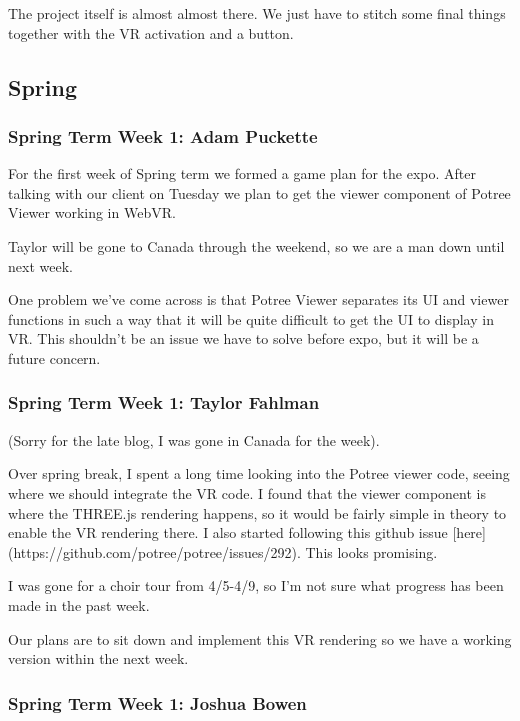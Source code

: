 \documentclass[draftclsnofoot,onecolumn]{IEEEtran}
\begin{document}
The project itself is almost almost there. We just have to stitch some final things together with the VR activation and a button.

\subsection{Spring}

\subsubsection{Spring Term Week 1: Adam Puckette}

For the first week of Spring term we formed a game plan for the expo. After talking with our client on Tuesday we plan to get the viewer component of Potree Viewer working in WebVR.

Taylor will be gone to Canada through the weekend, so we are a man down until next week.

One problem we've come across is that Potree Viewer separates its UI and viewer functions in such a way that it will be quite difficult to get the UI to display in VR. This shouldn't be an issue we have to solve before expo, but it will be a future concern.

\subsubsection{Spring Term Week 1: Taylor Fahlman}

(Sorry for the late blog, I was gone in Canada for the week).

Over spring break, I spent a long time looking into the Potree viewer code, seeing where we should integrate the VR code. I found that the viewer component is where the THREE.js rendering happens, so it would be fairly simple in theory to enable the VR rendering there. I also started following this github issue [here](https://github.com/potree/potree/issues/292). This looks promising.

I was gone for a choir tour from 4/5-4/9, so I'm not sure what progress has been made in the past week.

Our plans are to sit down and implement this VR rendering so we have a working version within the next week. 

\subsubsection{Spring Term Week 1: Joshua Bowen}
\end{document}

